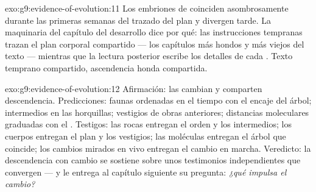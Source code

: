 \begin{solution}{exo:g9:evidence-of-evolution:11}
Los embriones de  coinciden asombrosamente durante las
primeras semanas del trazado del plan y divergen tarde. La maquinaria
del capítulo del desarrollo dice por qué: las instrucciones tempranas
trazan el plan corporal compartido --- los capítulos más hondos y más
viejos del texto --- mientras que la lectura posterior escribe los
detalles de cada . Texto temprano compartido, ascendencia honda
compartida.
\end{solution}

\begin{solution}{exo:g9:evidence-of-evolution:12}
Afirmación: las  cambian y comparten descendencia.
Predicciones: faunas ordenadas en el tiempo con el encaje del árbol;
intermedios en las horquillas; vestigios de obras anteriores;
distancias moleculares graduadas con el . Testigos: las rocas
entregan el orden y los intermedios; los cuerpos entregan el plan y los
vestigios; las moléculas entregan el árbol que coincide; los cambios
mirados en vivo entregan el cambio en marcha. Veredicto: la
descendencia con cambio se sostiene sobre unos testimonios
independientes que convergen --- y le entrega al capítulo siguiente su
pregunta: \emph{¿qué impulsa el cambio?}
\end{solution}

